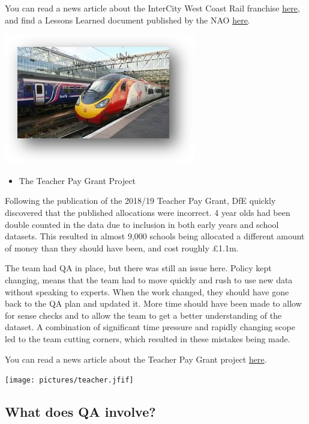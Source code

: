 \documentclass[
]{article}
\providecommand{\tightlist}{%
  \setlength{\itemsep}{0pt}\setlength{\parskip}{0pt}}
\begin{document}
You can read a news article about the InterCity West Coast Rail franchise \href{https://www.politics.co.uk/news/2013/02/26/complete-lack-of-common-sense-the-disaster-of-the-west-coast-franchise/}{here}, and find a Lessons Learned document published by the NAO \href{https://www.nao.org.uk/wp-content/uploads/2012/12/1213796.pdf}{here}.

\includegraphics{pictures/trains.jpg}

\begin{itemize}
\tightlist
\item
  The Teacher Pay Grant Project
\end{itemize}

Following the publication of the 2018/19 Teacher Pay Grant, DfE quickly discovered that the published allocations were incorrect. 4 year olds had been double counted in the data due to inclusion in both early years and school datasets. This resulted in almost 9,000 schools being allocated a different amount of money than they should have been, and cost roughly £1.1m.

The team had QA in place, but there was still an issue here. Policy kept changing, means that the team had to move quickly and rush to use new data without speaking to experts. When the work changed, they should have gone back to the QA plan and updated it. More time should have been made to allow for sense checks and to allow the team to get a better understanding of the dataset. A combination of significant time pressure and rapidly changing scope led to the team cutting corners, which resulted in these mistakes being made.

You can read a news article about the Teacher Pay Grant project \href{https://www.tes.com/news/schools-receive-more-cash-after-dfe-admits-double-counting-pupils}{here}.

\texttt{[image: pictures/teacher.jfif]}

\hypertarget{what-does-qa-involve}{%
\subsection{What does QA involve?}\label{what-does-qa-involve}}
\end{document}
